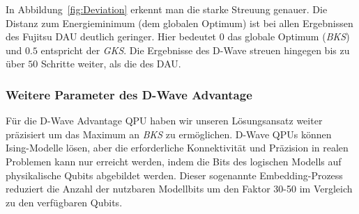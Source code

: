 In Abbildung~\ref{fig:Deviation} erkennt man die starke Streuung genauer. Die Distanz zum Energieminimum (dem globalen Optimum) ist bei allen Ergebnissen des Fujitsu DAU deutlich geringer. Hier bedeutet $0$ das globale Optimum (\textit{BKS}) und $0.5$ entspricht der \textit{GKS}. Die Ergebnisse des D-Wave streuen hingegen bis zu über $50$ Schritte weiter, als die des DAU.
 
\subsubsection{Weitere Parameter des D-Wave Advantage}
Für die  D-Wave Advantage QPU haben wir unseren Lösungsansatz weiter präzisiert um das Maximum an \textit{BKS} zu ermöglichen. 
D-Wave QPUs können Ising-Modelle lösen, aber die erforderliche Konnektivität und Präzision in realen Problemen kann nur erreicht werden, indem die Bits des logischen Modells auf physikalische Qubits abgebildet werden. \cite{QPU2021} Dieser sogenannte Embedding-Prozess reduziert die Anzahl der nutzbaren Modellbits um den Faktor 30-50 im Vergleich zu den verfügbaren Qubits.\cite{Handbook2021} 

